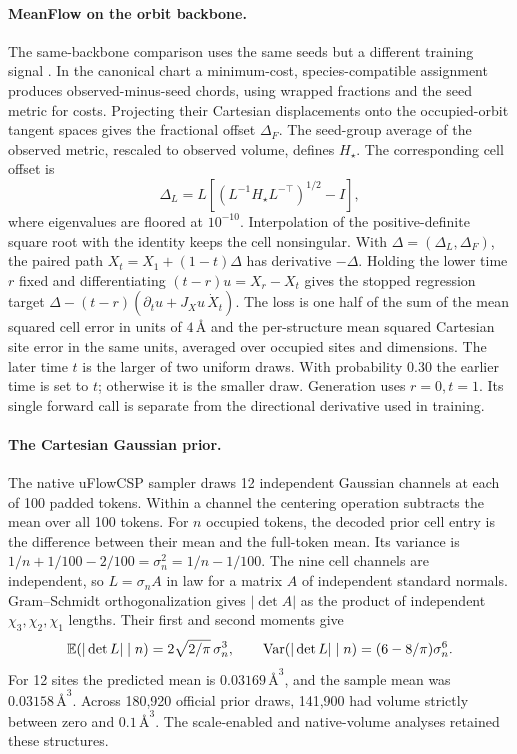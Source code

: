 \paragraph{MeanFlow on the orbit backbone.}
The same-backbone comparison uses the same seeds but a different training signal \cite{meanflow}. In the canonical chart a minimum-cost, species-compatible assignment produces observed-minus-seed chords, using wrapped fractions and the seed metric for costs. Projecting their Cartesian displacements onto the occupied-orbit tangent spaces gives the fractional offset \(\Delta_F\). The seed-group average of the observed metric, rescaled to observed volume, defines \(H_\star\). The corresponding cell offset is
\[
 \Delta_L=L\left[(L^{-1}H_\star L^{-\top})^{1/2}-I\right],
\]
where eigenvalues are floored at \(10^{-10}\). Interpolation of the positive-definite square root with the identity keeps the cell nonsingular. With \(\Delta=(\Delta_L,\Delta_F)\), the paired path \(X_t=X_1+(1-t)\Delta\) has derivative \(-\Delta\). Holding the lower time \(r\) fixed and differentiating \((t-r)u=X_r-X_t\) gives the stopped regression target \(\Delta-(t-r)(\partial_tu+J_Xu\,\dot X_t)\). The loss is one half of the sum of the mean squared cell error in units of \(4\,\text{\AA}\) and the per-structure mean squared Cartesian site error in the same units, averaged over occupied sites and dimensions. The later time \(t\) is the larger of two uniform draws. With probability \(0.30\) the earlier time is set to \(t\); otherwise it is the smaller draw. Generation uses \(r=0,t=1\). Its single forward call is separate from the directional derivative used in training.

\paragraph{The Cartesian Gaussian prior.}
The native uFlowCSP sampler \cite{uflow} draws 12 independent Gaussian channels at each of 100 padded tokens. Within a channel the centering operation subtracts the mean over all 100 tokens. For \(n\) occupied tokens, the decoded prior cell entry is the difference between their mean and the full-token mean. Its variance is \(1/n+1/100-2/100=\sigma_n^2=1/n-1/100\). The nine cell channels are independent, so \(L=\sigma_n A\) in law for a matrix \(A\) of independent standard normals. Gram--Schmidt orthogonalization gives \(|\det A|\) as the product of independent \(\chi_3,\chi_2,\chi_1\) lengths. Their first and second moments give
\[
 {\mathbb E}(|\det L|\mid n)=2\sqrt{2/\pi}\,\sigma_n^3,\qquad
 {\rm Var}(|\det L|\mid n)=(6-8/\pi)\sigma_n^6 .
\]
For 12 sites the predicted mean is \(0.03169\,\text{\AA}^3\), and the sample mean was \(0.03158\,\text{\AA}^3\). Across 180,920 official prior draws, 141,900 had volume strictly between zero and \(0.1\,\text{\AA}^3\). The scale-enabled and native-volume analyses retained these structures.

